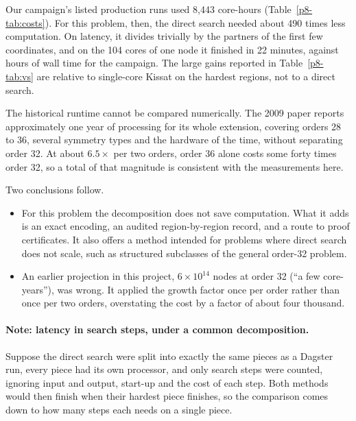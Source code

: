 \documentclass[11pt,a4paper,oneside]{report}
\theoremstyle{definition}
\begin{document}
Our campaign's listed production runs used 8{,}443 core-hours (Table~\ref{p8-tab:costs}). For this
problem, then, the direct search needed about 490 times less computation. On latency, it divides
trivially by the partners of the first few coordinates, and on the 104 cores of one node it finished in
22 minutes, against hours of wall time for the campaign. The large gains reported in Table~\ref{p8-tab:vs} are relative to single-core Kissat on the
hardest regions, not to a direct search.

The historical runtime cannot be compared numerically. The 2009 paper reports approximately one year
of processing for its whole extension, covering orders 28 to 36, several symmetry types and the
hardware of the time, without separating order 32. At about $6.5\times$ per two orders, order 36 alone
costs some forty times order 32, so a total of that magnitude is consistent with the measurements
here.

Two conclusions follow.
\begin{itemize}
\item For this problem the decomposition does not save computation. What it adds is an exact
encoding, an audited region-by-region record, and a route to proof certificates. It also offers a
method intended for problems where direct search does not scale, such as structured subclasses of
the general order-32 problem.
\item An earlier projection in this project, $6\times10^{14}$ nodes at order 32 (``a few
core-years''), was wrong. It applied the growth factor once per order rather than once per two orders,
overstating the cost by a factor of about four thousand.
\end{itemize}

\paragraph{Note: latency in search steps, under a common decomposition.}
Suppose the direct search were split into exactly the same pieces as a Dagster run, every piece
had its own processor, and only search steps were counted, ignoring input and output, start-up
and the cost of each step. Both methods would then finish when their hardest piece finishes, so
the comparison comes down to how many steps each needs on a single piece.
\end{document}
